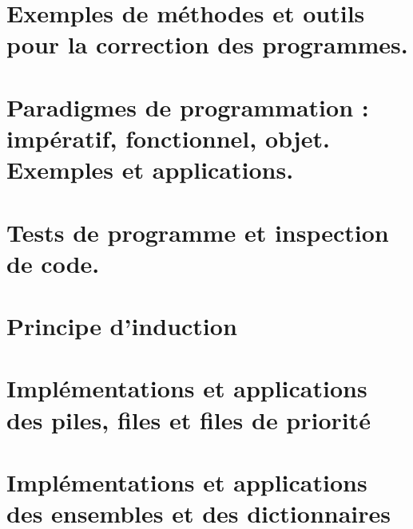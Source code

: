 




%

\tableofcontents

%

%
\chapter{Exemples de méthodes et outils pour la correction des programmes.} \label{L1}


\chapter{Paradigmes de programmation : impératif, fonctionnel, objet. Exemples et applications.} \label{L2}


\chapter{Tests de programme et inspection de code.}
\label{L3}


\chapter{Principe d'induction}
\label{L4}


\chapter{Implémentations et applications des piles, files et files de priorité}
\label{L5}


\chapter{Implémentations et applications des ensembles et des dictionnaires}
\label{L6}



